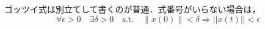 \documentclass[a4j, dvipdfmx]{jsarticle}
\begin{document}
  \par ゴッツイ式は別立てして書くのが普通．式番号がいらない場合は，
    \[
      \forall \epsilon > 0 \quad \exists \delta > 0 \quad
      \text{s.t.} \quad
        \|x(0)\| < \delta \Rightarrow ||x(t)|| < \epsilon
    \]
\end{document}
